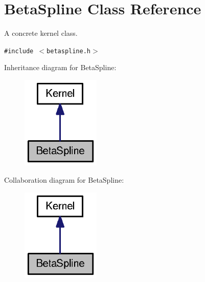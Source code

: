 \hypertarget{classBetaSpline}{
\section{BetaSpline Class Reference}
\label{classBetaSpline}
}
A concrete kernel class.  


{\tt \#include $<$betaspline.h$>$}

Inheritance diagram for BetaSpline:\nopagebreak
\begin{figure}[H]
\begin{center}
\leavevmode
\includegraphics[width=106pt]{classBetaSpline__inherit__graph}
\end{center}
\end{figure}
Collaboration diagram for BetaSpline:\nopagebreak
\begin{figure}[H]
\begin{center}
\leavevmode
\includegraphics[width=106pt]{classBetaSpline__coll__graph}
\end{center}
\end{figure}
